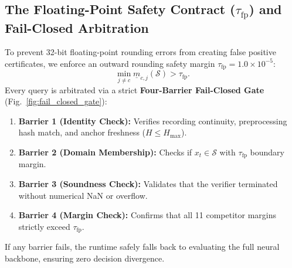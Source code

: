 \documentclass[journal,onecolumn,10pt]{IEEEtran}
\theoremstyle{remark}
\begin{document}
\subsection{The Floating-Point Safety Contract (\texorpdfstring{$\tau_{\text{fp}}$}{tau\_fp}) and Fail-Closed Arbitration}
To prevent 32-bit floating-point rounding errors from creating false positive certificates, we enforce an outward rounding safety margin $\tau_{\text{fp}} = 1.0 \times 10^{-5}$:
\begin{equation}
\min_{j \neq c} \underline{m}_{c,j}(\mathcal{S}) > \tau_{\text{fp}}.
\end{equation}
Every query is arbitrated via a strict \textbf{Four-Barrier Fail-Closed Gate} (Fig.~\ref{fig:fail_closed_gate}):
\begin{enumerate}[leftmargin=1.4em]
  \item \textbf{Barrier 1 (Identity Check):} Verifies recording continuity, preprocessing hash match, and anchor freshness ($H \le H_{\max}$).
  \item \textbf{Barrier 2 (Domain Membership):} Checks if $x_t \in \mathcal{S}$ with $\tau_{\text{fp}}$ boundary margin.
  \item \textbf{Barrier 3 (Soundness Check):} Validates that the verifier terminated without numerical NaN or overflow.
  \item \textbf{Barrier 4 (Margin Check):} Confirms that all 11 competitor margins strictly exceed $\tau_{\text{fp}}$.
\end{enumerate}
If any barrier fails, the runtime safely falls back to evaluating the full neural backbone, ensuring zero decision divergence.
\end{document}
